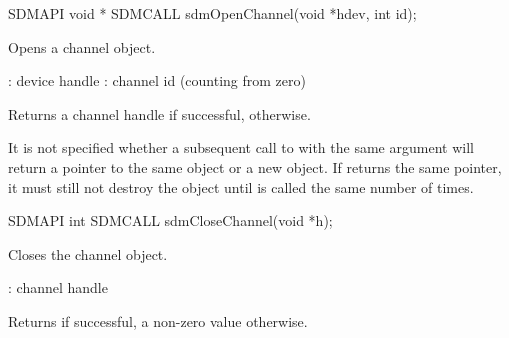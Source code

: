 \documentclass[a4paper,12pt,twoside,extrafontsizes]{memoir}
\begin{document}


\begin{cfuncprototype}
SDMAPI void * SDMCALL sdmOpenChannel(void *hdev, int id);
\end{cfuncprototype}

\begin{funcdescr}
	Opens a channel object.
\end{funcdescr}

\begin{funcparams}
	: device handle
	: channel id (counting from zero)
\end{funcparams}

\begin{funcret}
	Returns a channel handle if successful,  otherwise.
\end{funcret}

\begin{funcremarks}
	It is not specified whether a subsequent call to  with the same  argument will return a pointer to the same object or a new object. If  returns the same pointer, it must still not destroy the object until  is called the same number of times.
\end{funcremarks}



\begin{cfuncprototype}
SDMAPI int SDMCALL sdmCloseChannel(void *h);
\end{cfuncprototype}

\begin{funcdescr}
	Closes the channel object.
\end{funcdescr}

\begin{funcparams}
	: channel handle
\end{funcparams}

\begin{funcret}
	Returns  if successful, a non-zero value otherwise.
\end{funcret}

\end{document}
